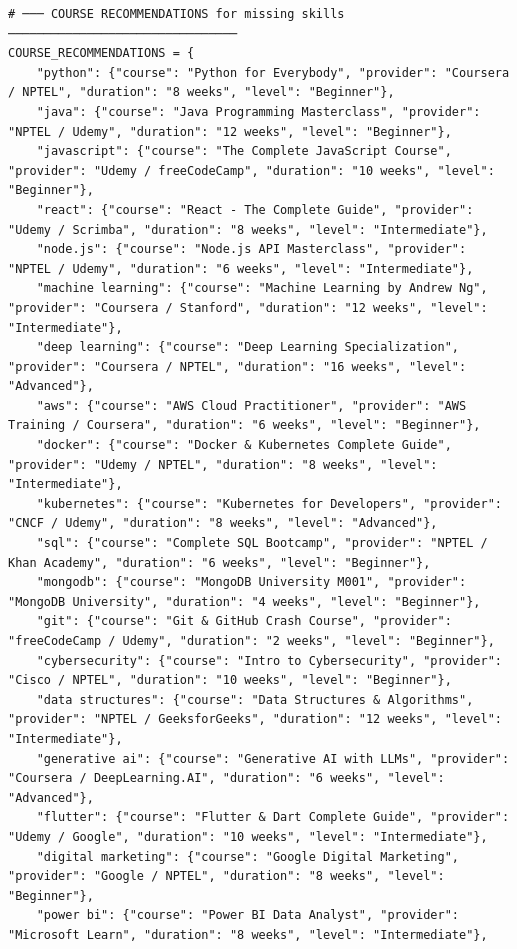 \documentclass[12pt,a4paper]{report}
\begin{document}
\begin{verbatim}
# ─── COURSE RECOMMENDATIONS for missing skills ────────────────────────────────
COURSE_RECOMMENDATIONS = {
    "python": {"course": "Python for Everybody", "provider": "Coursera / NPTEL", "duration": "8 weeks", "level": "Beginner"},
    "java": {"course": "Java Programming Masterclass", "provider": "NPTEL / Udemy", "duration": "12 weeks", "level": "Beginner"},
    "javascript": {"course": "The Complete JavaScript Course", "provider": "Udemy / freeCodeCamp", "duration": "10 weeks", "level": "Beginner"},
    "react": {"course": "React - The Complete Guide", "provider": "Udemy / Scrimba", "duration": "8 weeks", "level": "Intermediate"},
    "node.js": {"course": "Node.js API Masterclass", "provider": "NPTEL / Udemy", "duration": "6 weeks", "level": "Intermediate"},
    "machine learning": {"course": "Machine Learning by Andrew Ng", "provider": "Coursera / Stanford", "duration": "12 weeks", "level": "Intermediate"},
    "deep learning": {"course": "Deep Learning Specialization", "provider": "Coursera / NPTEL", "duration": "16 weeks", "level": "Advanced"},
    "aws": {"course": "AWS Cloud Practitioner", "provider": "AWS Training / Coursera", "duration": "6 weeks", "level": "Beginner"},
    "docker": {"course": "Docker & Kubernetes Complete Guide", "provider": "Udemy / NPTEL", "duration": "8 weeks", "level": "Intermediate"},
    "kubernetes": {"course": "Kubernetes for Developers", "provider": "CNCF / Udemy", "duration": "8 weeks", "level": "Advanced"},
    "sql": {"course": "Complete SQL Bootcamp", "provider": "NPTEL / Khan Academy", "duration": "6 weeks", "level": "Beginner"},
    "mongodb": {"course": "MongoDB University M001", "provider": "MongoDB University", "duration": "4 weeks", "level": "Beginner"},
    "git": {"course": "Git & GitHub Crash Course", "provider": "freeCodeCamp / Udemy", "duration": "2 weeks", "level": "Beginner"},
    "cybersecurity": {"course": "Intro to Cybersecurity", "provider": "Cisco / NPTEL", "duration": "10 weeks", "level": "Beginner"},
    "data structures": {"course": "Data Structures & Algorithms", "provider": "NPTEL / GeeksforGeeks", "duration": "12 weeks", "level": "Intermediate"},
    "generative ai": {"course": "Generative AI with LLMs", "provider": "Coursera / DeepLearning.AI", "duration": "6 weeks", "level": "Advanced"},
    "flutter": {"course": "Flutter & Dart Complete Guide", "provider": "Udemy / Google", "duration": "10 weeks", "level": "Intermediate"},
    "digital marketing": {"course": "Google Digital Marketing", "provider": "Google / NPTEL", "duration": "8 weeks", "level": "Beginner"},
    "power bi": {"course": "Power BI Data Analyst", "provider": "Microsoft Learn", "duration": "8 weeks", "level": "Intermediate"},

\end{verbatim}
\end{document}
